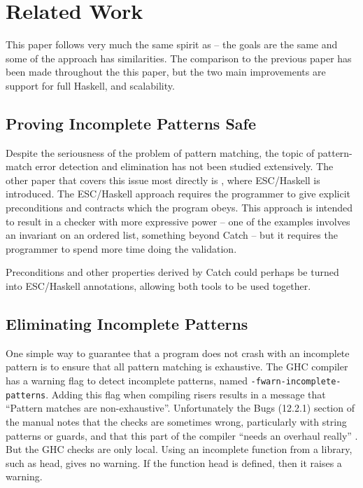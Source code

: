 \documentclass[preprint]{sigplanconf}
\let\cite=\citep
\newcommand{\T}[1]{\texttt{#1}}
\newcommand{\C}[1]{\textsf{#1}}
\begin{document}
\section{Related Work}
\label{sec:related}

This paper follows very much the same spirit as \cite{me:catch_tfp} -- the goals are the same and some of the approach has similarities. The comparison to the previous paper has been made throughout the this paper, but the two main improvements are support for full Haskell, and scalability.

\subsection{Proving Incomplete Patterns Safe}

Despite the seriousness of the problem of pattern matching, the topic of pattern-match error detection and elimination has not been studied extensively. The other paper that covers this issue most directly is \citep{esc_haskell}, where ESC/Haskell is introduced. The ESC/Haskell approach requires the programmer to give explicit preconditions and contracts which the program obeys. This approach is intended to result in a checker with more expressive power -- one of the examples involves an invariant on an ordered list, something beyond Catch -- but it requires the programmer to spend more time doing the validation.

Preconditions and other properties derived by Catch could perhaps be turned into ESC/Haskell annotations, allowing both tools to be used together.

\subsection{Eliminating Incomplete Patterns}

One simple way to guarantee that a program does not crash with an incomplete pattern is to ensure that all pattern matching is exhaustive. The GHC compiler  \citep{ghc} has a warning flag to detect incomplete patterns, named \T{-fwarn-incomplete-patterns}. Adding this flag when compiling risers results in a message that ``Pattern matches are non-exhaustive''. Unfortunately the Bugs (12.2.1) section of the manual notes that the checks are sometimes wrong, particularly with string patterns or guards, and that this part of the compiler ``needs an overhaul really'' \citep{ghc_manual}. But the GHC checks are only local. Using an incomplete function from a library, such as \C{head}, gives no warning. If the function \C{head} is defined, then it raises a warning.
\end{document}

